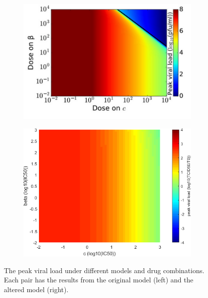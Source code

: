 \documentclass[a4paper,11pt]{article}
\begin{document}
\begin{figure}
\begin{subfigure}{0.4\textwidth}
    \includegraphics[width=\textwidth]{MBetaCP.png}
    \end{subfigure}
    \begin{subfigure}{0.35\textwidth}

    \includegraphics[width=\textwidth]{BetaC_peaks.png}
    \end{subfigure}
    \caption{\small The peak viral load under different models and drug combinations. Each pair has the results from the original model (left) and the altered model (right).}
    \label{fig:my_label}
    \end{figure}


\newpage
\end{document}
